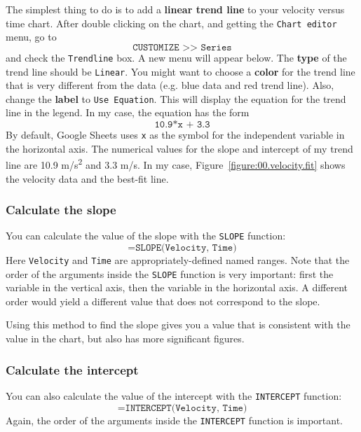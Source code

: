 The simplest thing to do is to add a \textbf{linear trend line} to your velocity versus time chart. After double clicking on the chart, and getting the \texttt{Chart editor} menu, go to
\begin{equation}
    \texttt{CUSTOMIZE >> Series}
\end{equation}
and check the \texttt{Trendline} box. A new menu will appear below. The \textbf{type} of the trend line should be \texttt{Linear}. You might want to choose a \textbf{color} for the trend line that is very different from the data (e.g. blue data and red trend line). Also, change the \textbf{label} to \texttt{Use Equation}. This will display the equation for the trend line in the legend. In my case, the equation has the form
\begin{equation}
    \texttt{10.9*x + 3.3}
\end{equation}
By default, Google Sheets uses \texttt{x} as the symbol for the independent variable in the horizontal axis. The numerical values for the slope and intercept of my trend line are 10.9 m/s\textsuperscript{2} and 3.3 m/s. In my case, Figure~\ref{figure:00.velocity.fit} shows the velocity data and the best-fit line.
%
\subsubsection{Calculate the slope}
%
You can calculate the value of the slope with the \texttt{SLOPE} function:
\begin{equation}
    \texttt{=SLOPE(Velocity, Time)}
\end{equation}
Here \texttt{Velocity} and \texttt{Time} are appropriately-defined named ranges. Note that the order of the arguments inside the \texttt{SLOPE} function is very important: first the variable in the vertical axis, then the variable in the horizontal axis. A different order would yield a different value that does not correspond to the slope.

Using this method to find the slope gives you a value that is consistent with the value in the chart, but also has more significant figures.
%
\subsubsection{Calculate the intercept}
%
You can also calculate the value of the intercept with the \texttt{INTERCEPT} function:
\begin{equation}
    \texttt{=INTERCEPT(Velocity, Time)}
\end{equation}
Again, the order of the arguments inside the \texttt{INTERCEPT} function is important.
%
